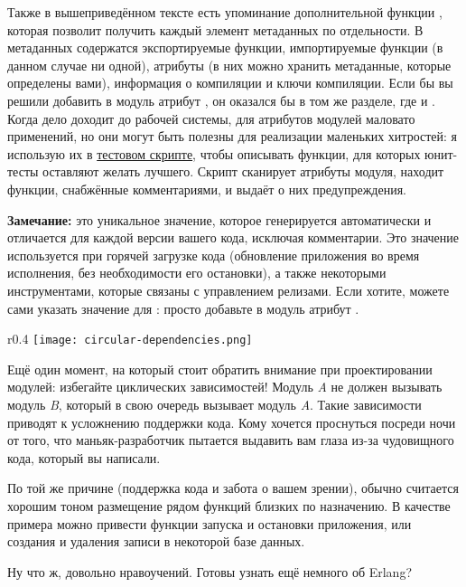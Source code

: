 Также в вышеприведённом тексте есть упоминание дополнительной функции , которая позволит получить каждый элемент метаданных по отдельности.
В метаданных содержатся экспортируемые функции, импортируемые функции (в данном случае ни одной), атрибуты (в них можно хранить метаданные, которые определены вами), информация о компиляции и ключи компиляции.
Если бы вы решили добавить в модуль атрибут , он оказался бы в том же разделе, где и .
Когда дело доходит до рабочей системы, для атрибутов модулей маловато применений, но они могут быть полезны для реализации маленьких хитростей: я использую их в \href{http://learnyousomeerlang.com/static/erlang/tester.erl}{тестовом скрипте}, чтобы описывать функции, для которых юнит\--тесты оставляют желать лучшего.
Скрипт сканирует атрибуты модуля, находит функции, снабжённые комментариями, и выдаёт о них предупреждения.\\ 
\colorbox{lgray}
{
    \begin{minipage}{1\linewidth}
        \textbf{Замечание:}  это уникальное значение, которое генерируется автоматически и отличается для каждой версии вашего кода, исключая комментарии.
        Это значение используется при горячей загрузке кода (обновление приложения во время исполнения, без необходимости его остановки), а также некоторыми инструментами, которые связаны с управлением релизами.
        Если хотите, можете сами указать значение для : просто добавьте в модуль атрибут .
    \end{minipage}
}

\begin{wrapfigure}{r}{0.4\linewidth}
    \texttt{[image: circular-dependencies.png]}
\end{wrapfigure}
Ещё один момент, на который стоит обратить внимание при проектировании модулей: избегайте циклических зависимостей!
Модуль \emph{A} не должен вызывать модуль \emph{B}, который в свою очередь вызывает модуль \emph{A}.
Такие зависимости приводят к усложнению поддержки кода.
Кому хочется проснуться посреди ночи от того, что маньяк\--разработчик пытается выдавить вам глаза из\--за чудовищного кода, который вы написали.

По той же причине (поддержка кода и забота о вашем зрении), обычно считается хорошим тоном размещение рядом функций близких по назначению.
В качестве примера можно привести функции запуска и остановки приложения, или создания и удаления записи в некоторой базе данных.

Ну что ж, довольно нравоучений.
Готовы узнать ещё немного об Erlang?
